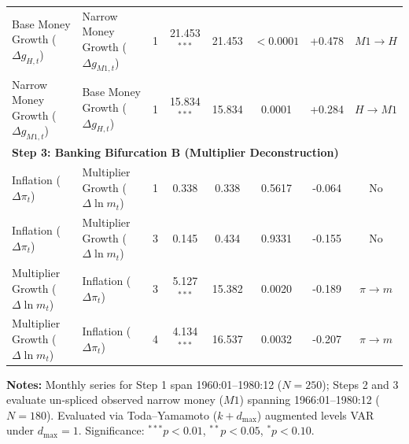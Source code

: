 \begin{table}[htbp]
{\begin{tabular}{llcccccc}
Base Money Growth ($\Delta g_{H,t}$) & Narrow Money Growth ($\Delta g_{M1,t}$) & 1 & 21.453$^{***}$ & 21.453 & $< 0.0001$ & +0.478 & $M1 \to H$ \\
Narrow Money Growth ($\Delta g_{M1,t}$) & Base Money Growth ($\Delta g_{H,t}$) & 1 & 15.834$^{***}$ & 15.834 & 0.0001 & +0.284 & $H \to M1$ \\
\multicolumn{8}{l}{\textbf{Step 3: Banking Bifurcation B (Multiplier Deconstruction)}} \\[0.15em]
Inflation ($\Delta \pi_t$) & Multiplier Growth ($\Delta \ln m_t$) & 1 & 0.338 & 0.338 & 0.5617 & -0.064 & No \\
Inflation ($\Delta \pi_t$) & Multiplier Growth ($\Delta \ln m_t$) & 3 & 0.145 & 0.434 & 0.9331 & -0.155 & No \\
Multiplier Growth ($\Delta \ln m_t$) & Inflation ($\Delta \pi_t$) & 3 & 5.127$^{***}$ & 15.382 & 0.0020 & -0.189 & $\pi \to m$ \\
Multiplier Growth ($\Delta \ln m_t$) & Inflation ($\Delta \pi_t$) & 4 & 4.134$^{***}$ & 16.537 & 0.0032 & -0.207 & $\pi \to m$ \\
\bottomrule
\end{tabular}%
}
\begin{minipage}{0.96\textwidth}
\vspace{0.3em}
\footnotesize \textbf{Notes:} Monthly series for Step 1 span 1960:01--1980:12 ($N=250$); Steps 2 and 3 evaluate un-spliced observed narrow money ($M1$) spanning 1966:01--1980:12 ($N=180$). Evaluated via Toda--Yamamoto ($k+d_{\max}$) augmented levels VAR under $d_{\max}=1$. Significance: $^{***} p < 0.01$, $^{**} p < 0.05$, $^{*} p < 0.10$.
\end{minipage}
\end{table}
